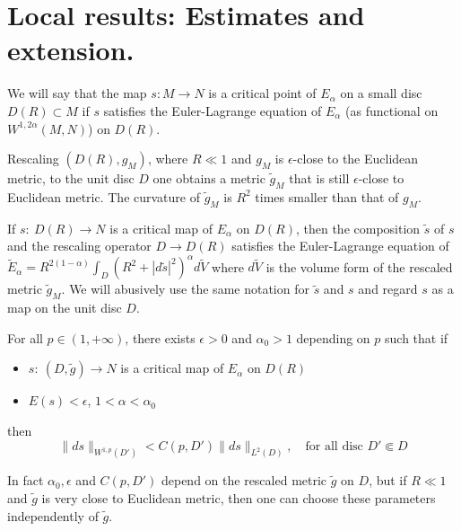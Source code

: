 \section{Local results: Estimates and extension.}
\label{sec:orgd635134}

We will say that the map \(s: M \longrightarrow N\) is a critical point of \(E_\alpha\) on a small disc \(D(R)\subset M\) if \(s\) satisfies the Euler-Lagrange equation of
\(E_\alpha\) (as functional on \(W^{1,2\alpha}(M,N)\)) on \(D(R)\).

\begin{remark}
\label{rem:rescal-Euclide}
Rescaling \((D(R), g_M)\), where \(R\ll 1\) and \(g_M\) is
\(\epsilon\)-close to the Euclidean metric, to the unit disc \(D\) one obtains a
metric \(\tilde g_M\) that is still \(\epsilon\)-close to Euclidean metric. The
curvature of \(\tilde g_M\) is \(R^2\) times smaller than that of \(g_M\).
\end{remark}

If \(s:\ D(R) \longrightarrow N\) is a critical map
of \(E_\alpha\) on \(D(R)\), then the composition \(\tilde s\) of \(s\) and the rescaling operator \(D
\longrightarrow D(R)\) satisfies the Euler-Lagrange equation of \(\tilde E_\alpha =
R^{2(1-\alpha)}\int_D (R^2 + |d\tilde s|^2)^\alpha d\tilde V\) where \(d\tilde V\) is
the volume form of the rescaled metric \(\tilde g_M\). We will abusively
use the same notation for \(\tilde s\) and \(s\) and regard \(s\) as a map on the unit disc \(D\). 

\begin{lemma}
\label{lem:main-est}
For all \(p\in (1,+\infty)\), there exists \(\epsilon>0\) and \(\alpha_0 >1\)
depending on \(p\) such that if
\begin{itemize}
\item \(s:\ (D,\tilde g) \longrightarrow N\) is a critical map of \(E_\alpha\) on \(D(R)\)
\item \(E(s) < \epsilon\), \(1 < \alpha <\alpha_0\)
\end{itemize}
then
\[
 \|ds\|_{W^{1,p}(D')} < C(p,D') \|ds\|_{L^2(D)},\quad \text{for all disc }  D'\Subset D 
\]
\end{lemma}

\begin{remark}
In fact \(\alpha_0, \epsilon\) and \(C(p,D')\) depend on the rescaled metric \(\tilde
g\) on \(D\), but if \(R \ll 1\) and \(\tilde g\) is very close to Euclidean metric,
then one can choose these parameters independently of \(\tilde g\). 
\end{remark}

